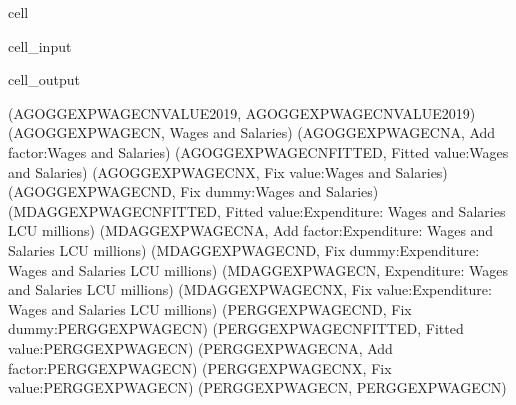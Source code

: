\documentclass[letterpaper,10pt,english]{jupyterBook}
\begin{document}
\begin{sphinxuseclass}{cell}\begin{sphinxVerbatimInput}

\begin{sphinxuseclass}{cell_input}
\begin{sphinxVerbatim}[commandchars=\\\{\}]
\end{sphinxVerbatim}

\end{sphinxuseclass}\end{sphinxVerbatimInput}
\begin{sphinxVerbatimOutput}

\begin{sphinxuseclass}{cell_output}
\begin{sphinxVerbatim}[commandchars=\\\{\}]
(\PYGZsq{}AGOGGEXPWAGECN\PYGZus{}VALUE\PYGZus{}2019\PYGZsq{}, \PYGZsq{}AGOGGEXPWAGECN\PYGZus{}VALUE\PYGZus{}2019\PYGZsq{})
(\PYGZsq{}AGOGGEXPWAGECN\PYGZsq{}, \PYGZsq{}Wages and Salaries\PYGZsq{})
(\PYGZsq{}AGOGGEXPWAGECN\PYGZus{}A\PYGZsq{}, \PYGZsq{}Add factor:Wages and Salaries\PYGZsq{})
(\PYGZsq{}AGOGGEXPWAGECN\PYGZus{}FITTED\PYGZsq{}, \PYGZsq{}Fitted  value:Wages and Salaries\PYGZsq{})
(\PYGZsq{}AGOGGEXPWAGECN\PYGZus{}X\PYGZsq{}, \PYGZsq{}Fix value:Wages and Salaries\PYGZsq{})
(\PYGZsq{}AGOGGEXPWAGECN\PYGZus{}D\PYGZsq{}, \PYGZsq{}Fix dummy:Wages and Salaries\PYGZsq{})
(\PYGZsq{}MDAGGEXPWAGECN\PYGZus{}FITTED\PYGZsq{}, \PYGZsq{}Fitted  value:Expenditure: Wages and Salaries LCU millions\PYGZsq{})
(\PYGZsq{}MDAGGEXPWAGECN\PYGZus{}A\PYGZsq{}, \PYGZsq{}Add factor:Expenditure: Wages and Salaries LCU millions\PYGZsq{})
(\PYGZsq{}MDAGGEXPWAGECN\PYGZus{}D\PYGZsq{}, \PYGZsq{}Fix dummy:Expenditure: Wages and Salaries LCU millions\PYGZsq{})
(\PYGZsq{}MDAGGEXPWAGECN\PYGZsq{}, \PYGZsq{}Expenditure: Wages and Salaries LCU millions\PYGZsq{})
(\PYGZsq{}MDAGGEXPWAGECN\PYGZus{}X\PYGZsq{}, \PYGZsq{}Fix value:Expenditure: Wages and Salaries LCU millions\PYGZsq{})
(\PYGZsq{}PERGGEXPWAGECN\PYGZus{}D\PYGZsq{}, \PYGZsq{}Fix dummy:PERGGEXPWAGECN\PYGZsq{})
(\PYGZsq{}PERGGEXPWAGECN\PYGZus{}FITTED\PYGZsq{}, \PYGZsq{}Fitted  value:PERGGEXPWAGECN\PYGZsq{})
(\PYGZsq{}PERGGEXPWAGECN\PYGZus{}A\PYGZsq{}, \PYGZsq{}Add factor:PERGGEXPWAGECN\PYGZsq{})
(\PYGZsq{}PERGGEXPWAGECN\PYGZus{}X\PYGZsq{}, \PYGZsq{}Fix value:PERGGEXPWAGECN\PYGZsq{})
(\PYGZsq{}PERGGEXPWAGECN\PYGZsq{}, \PYGZsq{}PERGGEXPWAGECN\PYGZsq{})
\end{sphinxVerbatim}

\end{sphinxuseclass}\end{sphinxVerbatimOutput}

\end{sphinxuseclass}
\end{document}
